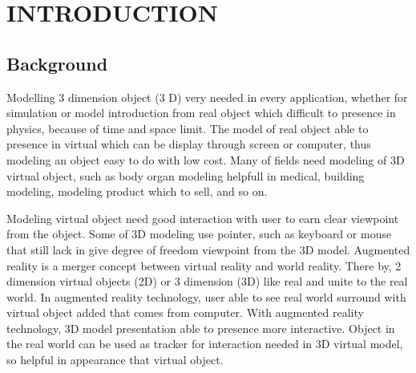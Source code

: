 \documentclass[12pt,a4paper,pdftex,final,oneside,titlepage]{book}
\begin{document}
\clearpage
{} 
\tableofcontents  %

\clearpage
{} 
\listoftables %

\clearpage
{} 
\listoffigures %
\chapter{INTRODUCTION} %
\label{chap:pendahuluan} 

\section{Background} %
\label{sec:latar_belakang} 
Modelling 3 dimension object (3 D) very needed in every application, whether for simulation or model introduction from real object which difficult to presence in physics, because of time and space limit. The model of real object able to presence in virtual which can be display through screen or computer, thus modeling an object easy to do with low cost. Many of fields need modeling of 3D virtual object, such as body organ modeling helpfull in medical, building modeling, modeling product which to sell, and so on.

Modeling virtual object need good interaction with user to earn clear viewpoint from the object. Some of 3D modeling use pointer, such as keyboard or mouse that still lack in give degree of freedom viewpoint from the 3D model. Augmented reality is a merger concept between virtual reality and world reality. There by, 2 dimension virtual objects (2D) or 3 dimension (3D) like real and unite to the real world. In augmented reality technology, user able to see real world surround with virtual object added that comes from computer. With augmented reality technology, 3D model presentation able to presence more interactive. Object in the real world can be used as tracker for interaction needed in 3D virtual model, so helpful in appearance that virtual object.
\end{document}

